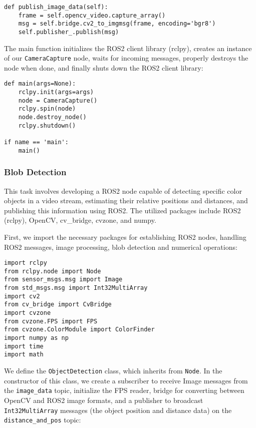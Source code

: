 \begin{lstlisting}[language=PythonPlus]
def publish_image_data(self):
    frame = self.opencv_video.capture_array()
    msg = self.bridge.cv2_to_imgmsg(frame, encoding='bgr8')
    self.publisher_.publish(msg)
\end{lstlisting}

The main function initializes the ROS2 client library (rclpy), creates an instance of our \verb|CameraCapture| node, waits for incoming messages, properly destroys the node when done, and finally shuts down the ROS2 client library:

\begin{lstlisting}[language=PythonPlus]
def main(args=None):
    rclpy.init(args=args)
    node = CameraCapture()
    rclpy.spin(node)
    node.destroy_node()
    rclpy.shutdown()

if name == 'main':
    main()
\end{lstlisting}

\newpage
\subsubsection{Blob Detection}

This task involves developing a ROS2 node capable of detecting specific color objects in a video stream, estimating their relative positions and distances, and publishing this information using ROS2. The utilized packages include ROS2 (rclpy), OpenCV, cv\_bridge, cvzone, and numpy.

First, we import the necessary packages for establishing ROS2 nodes, handling ROS2 messages, image processing, blob detection and numerical operations:

\begin{lstlisting}[language=PythonPlus]
import rclpy
from rclpy.node import Node
from sensor_msgs.msg import Image
from std_msgs.msg import Int32MultiArray
import cv2
from cv_bridge import CvBridge
import cvzone
from cvzone.FPS import FPS
from cvzone.ColorModule import ColorFinder
import numpy as np
import time
import math
\end{lstlisting}

We define the \verb|ObjectDetection| class, which inherits from \verb|Node|. In the constructor of this class, we create a subscriber to receive Image messages from the \verb|image_data| topic, initialize the FPS reader, bridge for converting between OpenCV and ROS2 image formats, and a publisher to broadcast \verb|Int32MultiArray| messages (the object position and distance data) on the \verb|distance_and_pos| topic:

